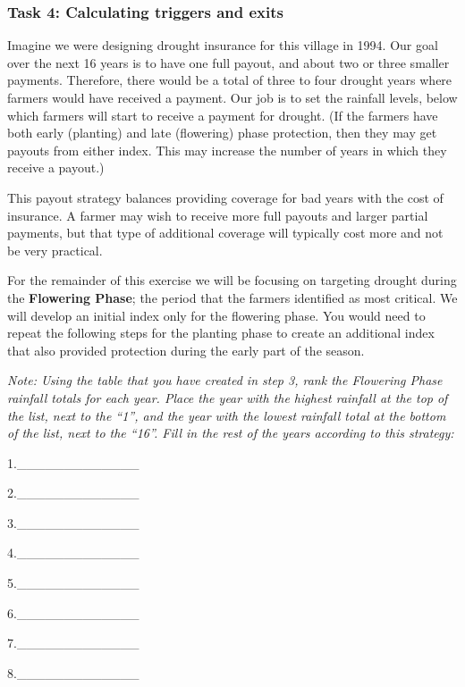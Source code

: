 \documentclass[letterpaper,10pt,english]{sphinxmanual}
\begin{document}
\subsubsection{Task 4: Calculating triggers and exits}
\label{whatisindexinsurance/designingindexbyhand:task-4-calculating-triggers-and-exits}
Imagine we were designing drought insurance for this village in 1994. Our goal over the next 16 years is to have one full payout, and about two or three smaller payments. Therefore, there would be a total of three to four drought years where farmers would have received a payment. Our job is to set the rainfall levels, below which farmers will start to receive a payment for drought. (If the farmers have both early (planting) and late (flowering) phase protection, then they may get payouts from either index. This may increase the number of years in which they receive a payout.)

This payout strategy balances providing coverage for bad years with the cost of insurance. A farmer may wish to receive more full payouts and larger partial payments, but that type of additional coverage will typically cost more and not be very practical.

For the remainder of this exercise we will be focusing on targeting drought during the \textbf{Flowering Phase}; the period that the farmers identified as most critical. We will develop an initial index only for the flowering phase. You would need to repeat the following steps for the planting phase to create an additional index that also provided protection during the early part of the season.

\emph{Note: Using the table that you have created in step 3, rank the Flowering Phase rainfall totals for each year. Place the year with the highest rainfall at the top of the list, next to the ``1'', and the year with the lowest rainfall total at the bottom of the list, next to the ``16''. Fill in the rest of the years according to this strategy:}

1.\_\_\_\_\_\_\_\_\_\_\_\_\_

2.\_\_\_\_\_\_\_\_\_\_\_\_\_

3.\_\_\_\_\_\_\_\_\_\_\_\_\_

4.\_\_\_\_\_\_\_\_\_\_\_\_\_

5.\_\_\_\_\_\_\_\_\_\_\_\_\_

6.\_\_\_\_\_\_\_\_\_\_\_\_\_

7.\_\_\_\_\_\_\_\_\_\_\_\_\_

8.\_\_\_\_\_\_\_\_\_\_\_\_\_
\end{document}

